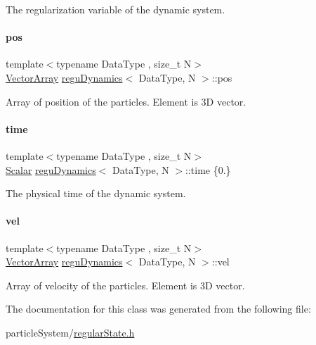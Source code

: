 The regularization variable of the dynamic system. 

\mbox{\label{classregu_dynamics_a5e39085954d2dd9bcaa545a00880f442}} 
\paragraph{\texorpdfstring{pos}{pos}}
{\footnotesize\ttfamily template$<$typename Data\+Type , size\+\_\+t N$>$ \\
\mbox{\hyperlink{classregu_dynamics_a86a05253d927e1716f3401e887aa5c8e}{Vector\+Array}} \mbox{\hyperlink{classregu_dynamics}{regu\+Dynamics}}$<$ Data\+Type, N $>$\+::pos}



Array of position of the particles. Element is 3D vector. 

\mbox{\label{classregu_dynamics_a05e287cf3f87cba248f69b5ff97a054d}} 
\paragraph{\texorpdfstring{time}{time}}
{\footnotesize\ttfamily template$<$typename Data\+Type , size\+\_\+t N$>$ \\
\mbox{\hyperlink{classregu_dynamics_a359c55370b4dee032396f0df86ad5fab}{Scalar}} \mbox{\hyperlink{classregu_dynamics}{regu\+Dynamics}}$<$ Data\+Type, N $>$\+::time \{0.\}}



The physical time of the dynamic system. 

\mbox{\label{classregu_dynamics_abf1176124ddfd429310f804491239801}} 
\paragraph{\texorpdfstring{vel}{vel}}
{\footnotesize\ttfamily template$<$typename Data\+Type , size\+\_\+t N$>$ \\
\mbox{\hyperlink{classregu_dynamics_a86a05253d927e1716f3401e887aa5c8e}{Vector\+Array}} \mbox{\hyperlink{classregu_dynamics}{regu\+Dynamics}}$<$ Data\+Type, N $>$\+::vel}



Array of velocity of the particles. Element is 3D vector. 



The documentation for this class was generated from the following file\+:\begin{DoxyCompactItemize}
\item 
particle\+System/\mbox{\hyperlink{regular_state_8h}{regular\+State.\+h}}\end{DoxyCompactItemize}

